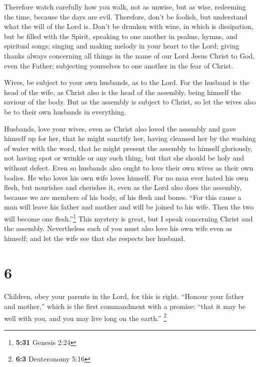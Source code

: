  Therefore watch carefully how you walk, not as unwise,
but as wise,  redeeming the time, because the days are
evil.  Therefore, don't be foolish, but understand what
the will of the Lord is.  Don't be drunken with wine, in
which is dissipation, but be filled with the Spirit, 
speaking to one another in psalms, hymns, and spiritual songs; singing
and making melody in your heart to the Lord;  giving
thanks always concerning all things in the name of our Lord Jesus Christ
to God, even the Father;  subjecting yourselves to one
another in the fear of Christ.

 Wives, be subject to your own husbands, as to the Lord.
 For the husband is the head of the wife, as Christ also
is the head of the assembly, being himself the saviour of the body.
 But as the assembly is subject to Christ, so let the
wives also be to their own husbands in everything.

 Husbands, love your wives, even as Christ also loved the
assembly and gave himself up for her,  that he might
sanctify her, having cleansed her by the washing of water with the word,
 that he might present the assembly to himself
gloriously, not having spot or wrinkle or any such thing, but that she
should be holy and without defect.  Even so husbands also
ought to love their own wives as their own bodies. He who loves his own
wife loves himself.  For no man ever hated his own flesh,
but nourishes and cherishes it, even as the Lord also does the assembly,
 because we are members of his body, of his flesh and
bones.  ``For this cause a man will leave his father and
mother and will be joined to his wife. Then the two will become one
flesh.''\footnote{\textbf{5:31} Genesis 2:24}  This
mystery is great, but I speak concerning Christ and the assembly.
 Nevertheless each of you must also love his own wife
even as himself; and let the wife see that she respects her husband.

\hypertarget{section-5}{%
\section{6}\label{section-5}}

 Children, obey your parents in the Lord, for this is
right.  ``Honour your father and mother,'' which is the
first commandment with a promise:  ``that it may be well
with you, and you may live long on the earth.'' \footnote{\textbf{6:3}
  Deuteronomy 5:16}

